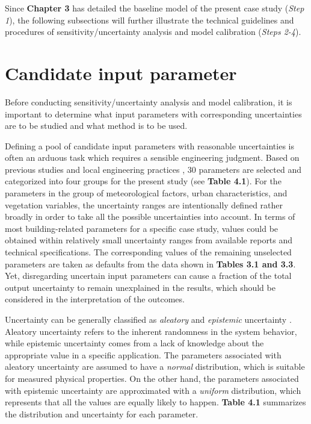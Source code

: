 Since \textbf{Chapter 3} has detailed the baseline model of the present case study (\textit{Step 1}), the following subsections will further illustrate the technical guidelines and procedures of sensitivity/uncertainty analysis and model calibration (\textit{Steps 2-4}).

\section{Candidate input parameter}

Before conducting sensitivity/uncertainty analysis and model calibration, it is important to determine what input parameters with corresponding uncertainties are to be studied and what method is to be used. 

Defining a pool of candidate input parameters with reasonable uncertainties is often an arduous task which requires a sensible engineering judgment. Based on previous studies \cite{bueno2013urban,bueno2014computationally,bueno2013calculation} and local engineering practices \cite{martin2015estimation,deru2011us,radhi2009evaluating,afshari2014life}, 30 parameters are selected and categorized into four groups for the present study (see \textbf{Table 4.1}). For the parameters in the group of meteorological factors, urban characteristics, and vegetation variables, the uncertainty ranges are intentionally defined rather broadly in order to take all the possible uncertainties into account. In terms of most building-related parameters for a specific case study, values could be obtained within relatively small uncertainty ranges from available reports and technical specifications. The corresponding values of the remaining unselected parameters are taken as defaults from the data shown in \textbf{Tables 3.1 and 3.3}. Yet, disregarding uncertain input parameters can cause a fraction of the total output uncertainty to remain unexplained in the results, which should be considered in the interpretation of the outcomes.

Uncertainty can be generally classified as \textit{aleatory} and \textit{epistemic} uncertainty \cite{helton1996guest}. Aleatory uncertainty refers to the inherent randomness in the system behavior, while epistemic uncertainty comes from a lack of knowledge about the appropriate value in a specific application. The parameters associated with aleatory uncertainty are assumed to have a \textit{normal} distribution, which is suitable for measured physical properties. On the other hand, the parameters associated with epistemic uncertainty are approximated with a \textit{uniform} distribution, which represents that all the values are equally likely to happen. \textbf{Table 4.1} summarizes the distribution and uncertainty for each parameter.

